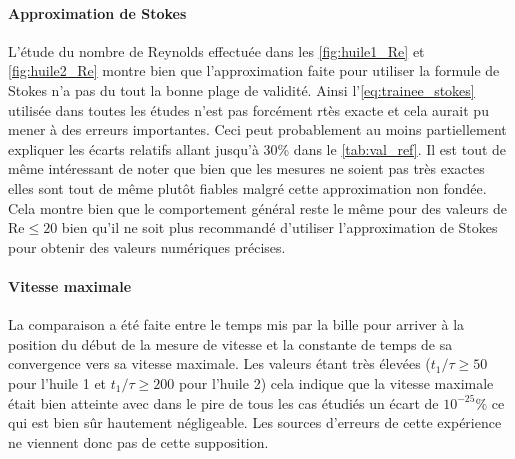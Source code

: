 \paragraph{Approximation de Stokes} L'étude du nombre de Reynolds effectuée dans les \autoref{fig:huile1_Re} et \autoref{fig:huile2_Re} montre bien que l'approximation faite pour utiliser la formule de Stokes n'a pas du tout la bonne plage de validité. Ainsi l'\autoref{eq:trainee_stokes} utilisée dans toutes les études n'est pas forcément rtès exacte et cela aurait pu mener à des erreurs importantes. Ceci peut probablement au moins partiellement expliquer les écarts relatifs allant jusqu'à 30\% dans le \autoref{tab:val_ref}. Il est tout de même intéressant de noter que bien que les mesures ne soient pas très exactes elles sont tout de même plutôt fiables malgré cette approximation non fondée. Cela montre bien que le comportement général reste le même pour des valeurs de $\mathrm{Re} \leq 20$ bien qu'il ne soit plus recommandé d'utiliser l'approximation de Stokes pour obtenir des valeurs numériques précises.


\paragraph{Vitesse maximale} La comparaison a été faite entre le temps mis par la bille pour arriver à la position du début de la mesure de vitesse et la constante de temps de sa convergence vers sa vitesse maximale. Les valeurs étant très élevées ($t_1/\tau \geq 50$ pour l'huile 1 et $t_1/\tau \geq 200$ pour l'huile 2) cela indique que la vitesse maximale était bien atteinte avec dans le pire de tous les cas étudiés un écart de $10^{-25} \%$ ce qui est bien sûr hautement négligeable. Les sources d'erreurs de cette expérience ne viennent donc pas de cette supposition.